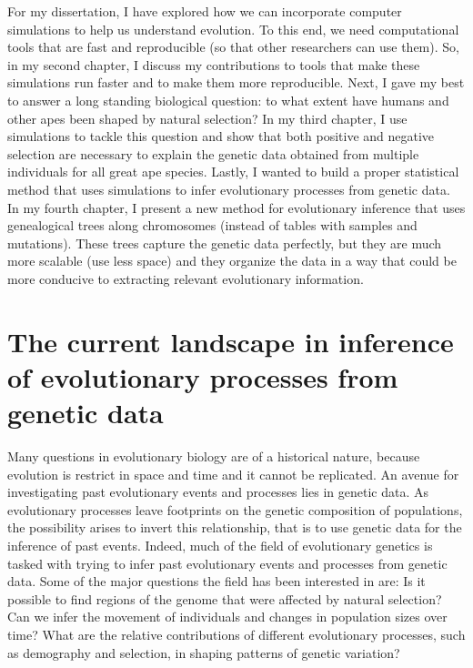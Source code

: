 For my dissertation, I have explored how we can incorporate computer simulations to help us understand evolution.
To this end, we need computational tools that are fast and reproducible (so that other researchers can use them).
So, in my second chapter, I discuss my contributions to tools that make these simulations run faster and to make them more reproducible.
Next, I gave my best to answer a long standing biological question: to what extent have humans and other apes been shaped by natural selection?
In my third chapter, I use simulations to tackle this question and show that both positive and negative selection are necessary to explain the genetic data obtained from multiple individuals for all great ape species.
Lastly, I wanted to build a proper statistical method that uses simulations to infer evolutionary processes from genetic data.
In my fourth chapter, I present a new method for evolutionary inference that uses genealogical trees along chromosomes (instead of tables with samples and mutations).
These trees capture the genetic data perfectly,
but they are much more scalable (use less space) and
they organize the data in a way that could be more conducive to extracting relevant evolutionary information.

\section{The current landscape in inference of evolutionary processes from genetic data}

Many questions in evolutionary biology are of a historical nature,
because evolution is restrict in space and time and it cannot be replicated.
An avenue for investigating past evolutionary events and processes lies in genetic data.
As evolutionary processes leave footprints on the genetic composition of populations,
the possibility arises to invert this relationship,
that is to use genetic data for the inference of past events.
Indeed, much of the field of evolutionary genetics is tasked with trying to infer past evolutionary events and processes from genetic data.
Some of the major questions the field has been interested in are:
Is it possible to find regions of the genome that were affected by natural selection?
Can we infer the movement of individuals and changes in population sizes over time?
What are the relative contributions of different evolutionary processes, such as demography and selection, in shaping patterns of genetic variation? 

